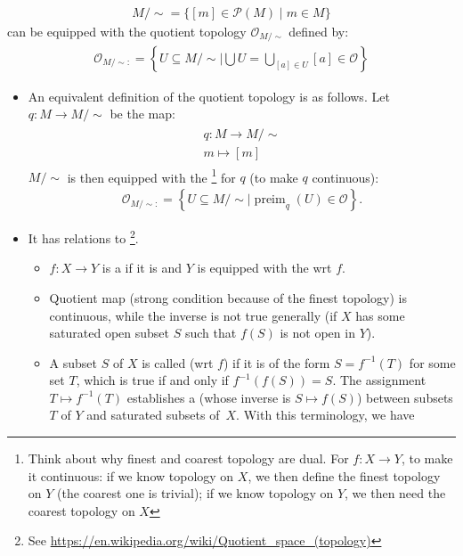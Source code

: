 \documentclass{article}
\begin{document}
\begin{enumerate}
\begin{enumerate}
\begin{align*}
M / \sim = \{[m] \in \mathcal{P}(M) \mid m \in M\}
\end{align*}
can be equipped with the quotient topology $\mathcal{O}_{M / \sim}$ defined by:
\begin{align*}
\mathcal{O}_{M / \sim:}=\left\{U \subseteq M / \sim \Bigg| \bigcup U=\bigcup_{[a] \in U}[a] \in \mathcal{O}\right\}
\end{align*}
\begin{itemize}
    \item An equivalent definition of the quotient topology is as follows. Let $q: M \rightarrow M / \sim$ be the map:
\begin{align*}
\begin{gathered}
q: M \rightarrow M / \sim \\
m \mapsto[m]
\end{gathered}
\end{align*}
$M / \sim $ is then equipped with the \footnote{Think about why finest and coarest topology are dual. For $f:X\rightarrow Y$, to make it continuous: if we know topology on $X$, we then define the finest topology on $Y$ (the coarest one is trivial); if we know topology on $Y$, we then need the coarest topology on $X$} for $q$ (to make $q$ continuous):
\begin{align*}
\mathcal{O}_{M / \sim:}=\left\{U \subseteq M / \sim \mid \operatorname{preim}_{q}(U) \in \mathcal{O}\right\} .
\end{align*}
\item It has relations to \footnote{See \url{https://en.wikipedia.org/wiki/Quotient_space_(topology)}}. 
\begin{itemize}[$\ast$]
\item {} $f: X\rightarrow Y$ is a  if it is  and $Y$ is equipped with the  \gls{wrt} $f$. 
    \item Quotient map (strong condition because of the finest topology) is continuous, while the inverse is not true generally (if $X$ has some saturated open subset $S$ such that $f(S)$ is not open in $Y$). 
    \item {} {\tiny A subset $S$ of $X$ is called  (\gls{wrt} $f$) if it is of the form $S=f^{-1}(T)$ for some set $T$, which is true if and only if $f^{-1}(f(S))=S$. 
    The assignment $T \mapsto f^{-1}(T)$ establishes a  (whose inverse is $S \mapsto f(S)$) between subsets $T$ of $Y$ and saturated subsets of~$X$.}
    With this terminology, we have 
    

\end{itemize}
\end{itemize}
\end{enumerate}
\end{enumerate}
\end{document}
